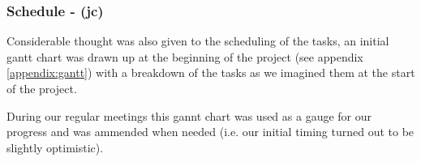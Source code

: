 \subsubsection{Schedule - (jc)}
Considerable thought was also given to the scheduling of the tasks, an initial gantt chart was drawn up
at the beginning of the project (see appendix \ref{appendix:gantt}) with a breakdown of the tasks as we
imagined them at the start of the project.

During our regular meetings this gannt chart was used as a gauge for our progress and was ammended when
needed (i.e. our initial timing turned out to be slightly optimistic).
